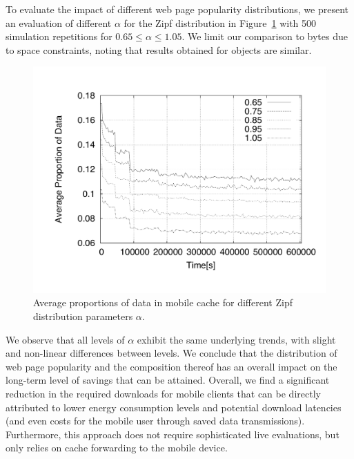 \documentclass[letterpaper,conference]{IEEEtran}
\begin{document}
To evaluate the impact of different web page popularity distributions, we present an evaluation of different $\alpha$ for the Zipf distribution in Figure~\ref{fig:sim3} with 500 simulation repetitions for $0.65 \le \alpha \le 1.05$.
We limit our comparison to bytes due to space constraints, noting that results obtained for objects are similar.
\begin{figure}[]
	\centering
	\includegraphics[width=.925\linewidth]{Fig8}
	\caption{Average proportions of data in mobile cache for different Zipf distribution parameters $\alpha$.}
	\label{fig:sim3}
\end{figure}
We observe that all levels of $\alpha$ exhibit the same underlying trends, with slight and non-linear differences between levels.
We conclude that the distribution of web page popularity and the composition thereof has an overall impact on the long-term level of savings that can be attained.
Overall, we find a significant reduction in the required downloads for mobile clients that can be directly attributed to lower energy consumption levels and potential download latencies (and even costs for the mobile user through saved data transmissions).
Furthermore, this approach does not require sophisticated live evaluations, but only relies on cache forwarding to the mobile device.
\end{document}
